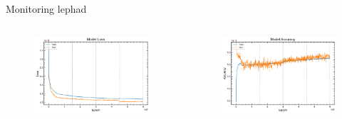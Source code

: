 \begin{frame}{Monitoring lephad}
\begin{columns}
  \begin{column}{0.5\textwidth}
    \begin{figure}
      \includegraphics[width=\textwidth]{loss_lephad.png}
    \end{figure}
  \end{column}
  \begin{column}{0.5\textwidth}
    \begin{figure}
      \includegraphics[width=\textwidth]{acc_lephad.png}
    \end{figure}
  \end{column}
\end{columns}
\end{frame}

